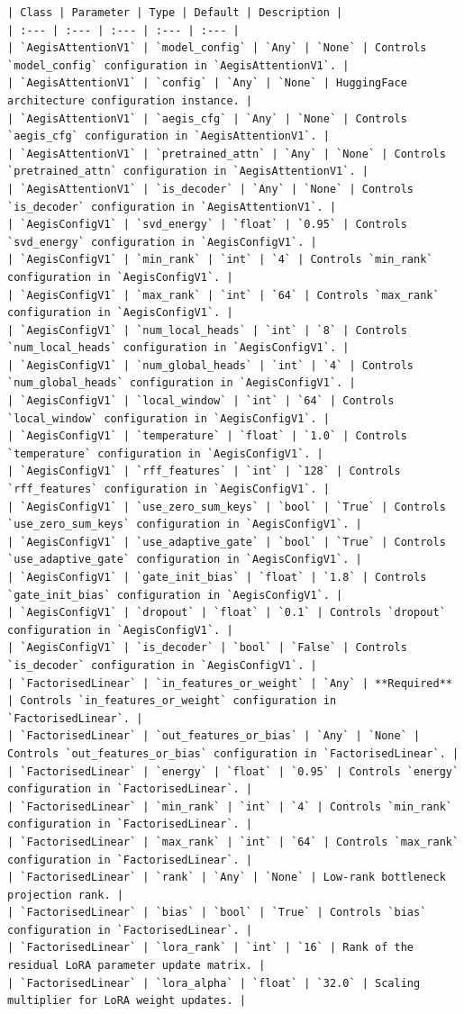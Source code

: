 \begin{verbatim}
| Class | Parameter | Type | Default | Description |
| :--- | :--- | :--- | :--- | :--- |
| `AegisAttentionV1` | `model_config` | `Any` | `None` | Controls `model_config` configuration in `AegisAttentionV1`. |
| `AegisAttentionV1` | `config` | `Any` | `None` | HuggingFace architecture configuration instance. |
| `AegisAttentionV1` | `aegis_cfg` | `Any` | `None` | Controls `aegis_cfg` configuration in `AegisAttentionV1`. |
| `AegisAttentionV1` | `pretrained_attn` | `Any` | `None` | Controls `pretrained_attn` configuration in `AegisAttentionV1`. |
| `AegisAttentionV1` | `is_decoder` | `Any` | `None` | Controls `is_decoder` configuration in `AegisAttentionV1`. |
| `AegisConfigV1` | `svd_energy` | `float` | `0.95` | Controls `svd_energy` configuration in `AegisConfigV1`. |
| `AegisConfigV1` | `min_rank` | `int` | `4` | Controls `min_rank` configuration in `AegisConfigV1`. |
| `AegisConfigV1` | `max_rank` | `int` | `64` | Controls `max_rank` configuration in `AegisConfigV1`. |
| `AegisConfigV1` | `num_local_heads` | `int` | `8` | Controls `num_local_heads` configuration in `AegisConfigV1`. |
| `AegisConfigV1` | `num_global_heads` | `int` | `4` | Controls `num_global_heads` configuration in `AegisConfigV1`. |
| `AegisConfigV1` | `local_window` | `int` | `64` | Controls `local_window` configuration in `AegisConfigV1`. |
| `AegisConfigV1` | `temperature` | `float` | `1.0` | Controls `temperature` configuration in `AegisConfigV1`. |
| `AegisConfigV1` | `rff_features` | `int` | `128` | Controls `rff_features` configuration in `AegisConfigV1`. |
| `AegisConfigV1` | `use_zero_sum_keys` | `bool` | `True` | Controls `use_zero_sum_keys` configuration in `AegisConfigV1`. |
| `AegisConfigV1` | `use_adaptive_gate` | `bool` | `True` | Controls `use_adaptive_gate` configuration in `AegisConfigV1`. |
| `AegisConfigV1` | `gate_init_bias` | `float` | `1.8` | Controls `gate_init_bias` configuration in `AegisConfigV1`. |
| `AegisConfigV1` | `dropout` | `float` | `0.1` | Controls `dropout` configuration in `AegisConfigV1`. |
| `AegisConfigV1` | `is_decoder` | `bool` | `False` | Controls `is_decoder` configuration in `AegisConfigV1`. |
| `FactorisedLinear` | `in_features_or_weight` | `Any` | **Required** | Controls `in_features_or_weight` configuration in `FactorisedLinear`. |
| `FactorisedLinear` | `out_features_or_bias` | `Any` | `None` | Controls `out_features_or_bias` configuration in `FactorisedLinear`. |
| `FactorisedLinear` | `energy` | `float` | `0.95` | Controls `energy` configuration in `FactorisedLinear`. |
| `FactorisedLinear` | `min_rank` | `int` | `4` | Controls `min_rank` configuration in `FactorisedLinear`. |
| `FactorisedLinear` | `max_rank` | `int` | `64` | Controls `max_rank` configuration in `FactorisedLinear`. |
| `FactorisedLinear` | `rank` | `Any` | `None` | Low-rank bottleneck projection rank. |
| `FactorisedLinear` | `bias` | `bool` | `True` | Controls `bias` configuration in `FactorisedLinear`. |
| `FactorisedLinear` | `lora_rank` | `int` | `16` | Rank of the residual LoRA parameter update matrix. |
| `FactorisedLinear` | `lora_alpha` | `float` | `32.0` | Scaling multiplier for LoRA weight updates. |
\end{verbatim}
